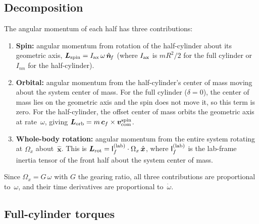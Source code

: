 \documentclass[11pt]{article}
\newcommand{\vect}[1]{\bm{#1}}
\newcommand{\uv}[1]{\hat{\bm{#1}}}
\newcommand{\xhat}{\uv{x}}
\newcommand{\nf}{\uv{n}_{\!f}}
\begin{document}
\subsection{Decomposition}

The angular momentum of each half has three contributions:
\begin{enumerate}
\item \textbf{Spin:} angular momentum from rotation of the
  half-cylinder about its geometric axis, $\vect{L}_{\rm spin}
  = I_{\rm ax}\,\omega\,\nf$ (where $I_{\rm ax}$ is $mR^2/2$
  for the full cylinder or $I_{nn}$ for the half-cylinder).
\item \textbf{Orbital:} angular momentum from the half-cylinder's
  center of mass moving about the system center of mass.  For the full
  cylinder ($\delta=0$), the center of mass lies on the geometric
  axis and the spin does not move it, so this term is zero.  For the
  half-cylinder, the offset center of mass orbits the geometric axis
  at rate~$\omega$, giving $\vect{L}_{\rm orb}=m\,\vect{c}_f
  \times\vect{v}_{\rm com}^{\rm spin}$.
\item \textbf{Whole-body rotation:} angular momentum from the
  entire system rotating at $\Omega_x$ about~$\xhat$.  This is
  $\vect{L}_{\rm rot}=\mathsf{I}_f^{(\rm lab)}\cdot\Omega_x\,\xhat$,
  where $\mathsf{I}_f^{(\rm lab)}$ is the lab-frame inertia tensor of
  the front half about the system center of mass.
\end{enumerate}

Since $\Omega_x=G\,\omega$ with $G$ the gearing ratio, all three
contributions are proportional to~$\omega$, and their time derivatives
are proportional to~$\dot\omega$.

\subsection{Full-cylinder torques}
\end{document}
